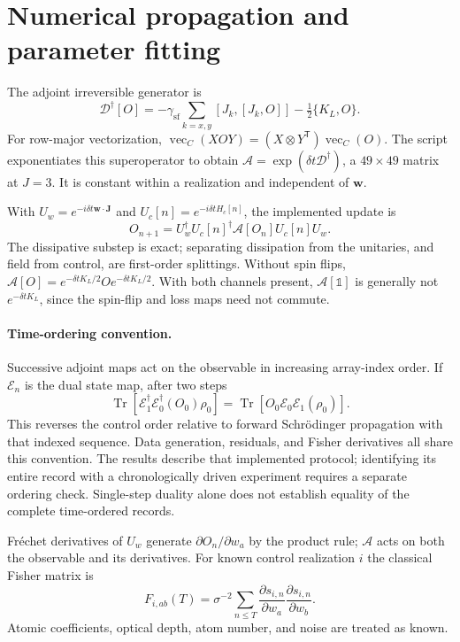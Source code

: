 \documentclass[11pt]{article}
\newcommand{\dt}{\delta t}
\newcommand{\Tr}{\operatorname{Tr}}
\newcommand{\id}{\mathbb{1}}
\begin{document}
\section{Numerical propagation and parameter fitting}
\label{sec:numerics}

The adjoint irreversible generator is
\begin{equation}
 \mathcal D^\dagger[O]=
 -\gamma_{\mathrm{sf}}\sum_{k=x,y}[J_k,[J_k,O]]-\tfrac12\{K_L,O\}.
\end{equation}
For row-major vectorization,
$\operatorname{vec}_C(XOY)=(X\otimes Y^{\mathsf T})\operatorname{vec}_C(O)$.
The script exponentiates this superoperator to obtain
$\mathcal A=\exp(\dt\mathcal D^\dagger)$, a $49\times49$ matrix at $J=3$.
It is constant within a realization and independent of $\bm w$.

With $U_w=e^{-i\dt\bm w\cdot\bm J}$ and $U_c[n]=e^{-i\dt H_c[n]}$, the
implemented update is
\begin{equation}
 O_{n+1}=U_w^\dagger U_c[n]^\dagger\mathcal A[O_n]U_c[n]U_w.
 \label{eq:implemented}
\end{equation}
The dissipative substep is exact; separating dissipation from the unitaries,
and field from control, are first-order splittings. Without spin flips,
$\mathcal A[O]=e^{-\dt K_L/2}Oe^{-\dt K_L/2}$. With both channels present,
$\mathcal A[\id]$ is generally not $e^{-\dt K_L}$, since the spin-flip and
loss maps need not commute.

\paragraph{Time-ordering convention.}
Successive adjoint maps act on the observable in increasing array-index order.
If $\mathcal E_n$ is the dual state map, after two steps
\begin{equation}
 \Tr[\mathcal E_1^\dagger\mathcal E_0^\dagger(O_0)\rho_0]
 =\Tr[O_0\mathcal E_0\mathcal E_1(\rho_0)].
\end{equation}
This reverses the control order relative to forward Schr\"odinger propagation
with that indexed sequence. Data generation, residuals, and Fisher derivatives
all share this convention. The results describe that implemented protocol;
identifying its entire record with a chronologically driven experiment requires
a separate ordering check. Single-step duality alone does not establish equality
of the complete time-ordered records.

Fr\'echet derivatives of $U_w$ generate $\partial O_n/\partial w_a$ by the
product rule; $\mathcal A$ acts on both the observable and its derivatives.
For known control realization $i$ the classical Fisher matrix is
\begin{equation}
 F_{i,ab}(T)=\sigma^{-2}\sum_{n\le T}
 \frac{\partial s_{i,n}}{\partial w_a}
 \frac{\partial s_{i,n}}{\partial w_b}.
 \label{eq:fisher}
\end{equation}
Atomic coefficients, optical depth, atom number, and noise are treated as known.
\end{document}
